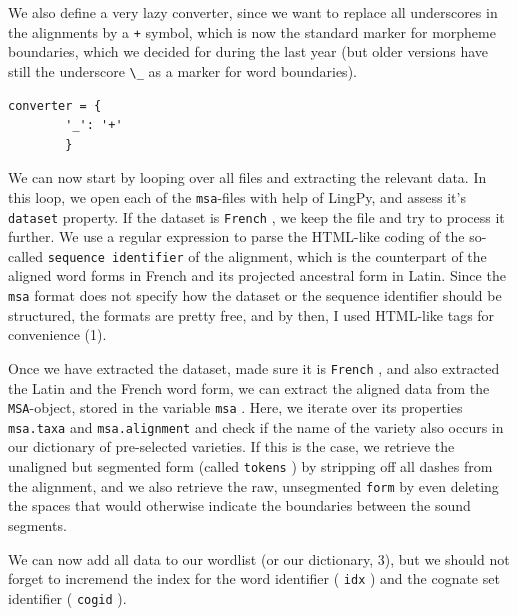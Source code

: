 \documentclass[
  a4paper,
  14pt,
  oneside,
  tablecaptionabove
]{scrbook}
\newcommand{\passthrough}[1]{#1}
\begin{document}
We also define a very lazy converter, since we want to replace all
underscores in the alignments by a \passthrough{\lstinline!+!} symbol,
which is now the standard marker for morpheme boundaries, which we
decided for during the last year (but older versions have still the
underscore \passthrough{\lstinline!\_!} as a marker for word
boundaries).

\begin{lstlisting}
converter = {
        '_': '+'
        }
\end{lstlisting}

We can now start by looping over all files and extracting the relevant
data. In this loop, we open each of the
\passthrough{\lstinline!msa!}-files with help of LingPy, and assess it's
\passthrough{\lstinline!dataset!} property. If the dataset is
\passthrough{\lstinline!French!} , we keep the file and try to process
it further. We use a regular expression to parse the HTML-like coding of
the so-called \passthrough{\lstinline!sequence identifier!} of the
alignment, which is the counterpart of the aligned word forms in French
and its projected ancestral form in Latin. Since the
\passthrough{\lstinline!msa!} format does not specify how the dataset or
the sequence identifier should be structured, the formats are pretty
free, and by then, I used HTML-like tags for convenience (1).

Once we have extracted the dataset, made sure it is
\passthrough{\lstinline!French!} , and also extracted the Latin and the
French word form, we can extract the aligned data from the
\passthrough{\lstinline!MSA!}-object, stored in the variable
\passthrough{\lstinline!msa!} . Here, we iterate over its properties
\passthrough{\lstinline!msa.taxa!} and
\passthrough{\lstinline!msa.alignment!} and check if the name of the
variety also occurs in our dictionary of pre-selected varieties. If this
is the case, we retrieve the unaligned but segmented form (called
\passthrough{\lstinline!tokens!} ) by stripping off all dashes from the
alignment, and we also retrieve the raw, unsegmented
\passthrough{\lstinline!form!} by even deleting the spaces that would
otherwise indicate the boundaries between the sound segments.

We can now add all data to our wordlist (or our dictionary, 3), but we
should not forget to incremend the index for the word identifier (
\passthrough{\lstinline!idx!} ) and the cognate set identifier (
\passthrough{\lstinline!cogid!} ).
\end{document}
